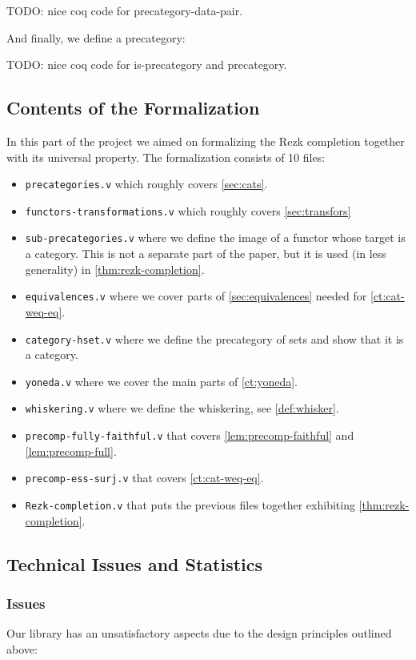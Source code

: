 TODO: nice coq code for precategory-data-pair.

And finally, we define a precategory:

TODO: nice coq code for is-precategory and precategory.


\subsection*{Contents of the Formalization}

In this part of the project we aimed on formalizing the Rezk completion together with its universal property. The formalization consists of 10 files:
\begin{itemize}
 \item \texttt{precategories.v} which roughly covers \autoref{sec:cats}.
 \item \texttt{functors-transformations.v} which roughly covers \autoref{sec:transfors}
 \item \texttt{sub-precategories.v} where we define the image of a functor whose target is a category. 
          This is not a separate part of the paper, but it is used (in less generality) in \autoref{thm:rezk-completion}.
 \item \texttt{equivalences.v} where we cover parts of \autoref{sec:equivalences} needed for \autoref{ct:cat-weq-eq}.
 \item \texttt{category-hset.v} where we define the precategory of sets and show that it is a category.
 \item \texttt{yoneda.v} where we cover the main parts of \autoref{ct:yoneda}.
 \item \texttt{whiskering.v} where we define the whiskering, see \autoref{def:whisker}.
 \item \texttt{precomp-fully-faithful.v} that covers \autoref{lem:precomp-faithful} and \ref{lem:precomp-full}.
 \item \texttt{precomp-ess-surj.v} that covers \autoref{ct:cat-weq-eq}.
 \item \texttt{Rezk-completion.v} that puts the previous files together exhibiting \autoref{thm:rezk-completion}.
\end{itemize}
\subsection*{Technical Issues and Statistics}


\subsubsection*{Issues}
Our library has an unsatisfactory aspects due to the design principles outlined above:

